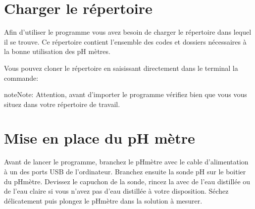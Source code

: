 \documentclass[letterpaper,10pt,french]{sphinxmanual}
\begin{document}
\sphinxAtStartPar
{}


\section{Charger le répertoire}
\label{\detokenize{install:charger-le-repertoire}}
\sphinxAtStartPar
Afin d’utiliser le programme vous avez besoin de charger le répertoire dans lequel il se trouve. Ce répertoire
contient l’ensemble des codes et dossiers nécessaires à la bonne utilisation des pH mètres.

\sphinxAtStartPar
Vous pouvez cloner le répertoire en saisissant directement dans le terminal la commande:

\begin{sphinxVerbatim}[commandchars=\\\{\}]
  
\end{sphinxVerbatim}

\begin{sphinxadmonition}{note}{Note:}
\sphinxAtStartPar
Attention, avant d’importer le programme vérifiez bien que vous vous situez dans votre répertoire de travail.
\end{sphinxadmonition}


\section{Mise en place du pH mètre}
\label{\detokenize{install:mise-en-place-du-ph-metre}}
\sphinxAtStartPar
Avant de lancer le programme, branchez le pH\sphinxhyphen{}mètre avec le cable d’alimentation à un des ports USB
de l’ordinateur. Branchez ensuite la sonde pH sur le boitier du pH\sphinxhyphen{}mètre. Devissez le capuchon de la
sonde, rincez la avec de l’eau distillée ou de l’eau claire si vous n’avez pas d’eau distillée
à votre disposition. Séchez délicatement puis plongez le pH\sphinxhyphen{}mètre dans la solution à mesurer.
\end{document}
